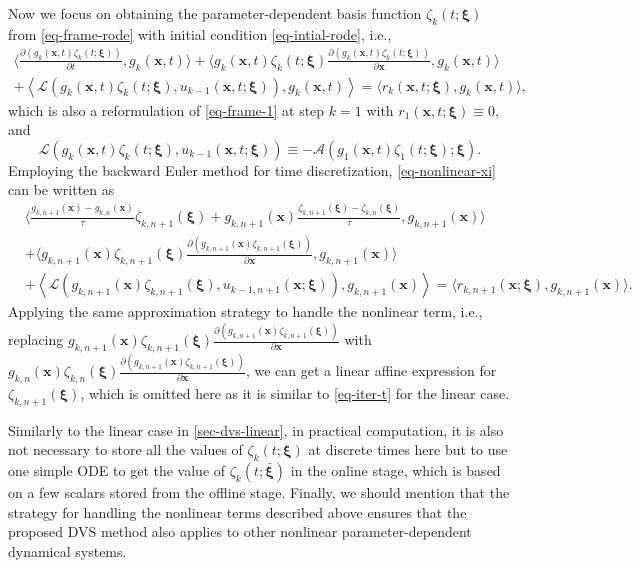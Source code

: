\documentclass[10pt,a4paper]{article}
\numberwithin{equation}{section}
\numberwithin{lemma}{section}
\numberwithin{example}{section}
\numberwithin{definition}{section}
\numberwithin{assumption}{section}
\numberwithin{theorem}{section}
\numberwithin{proposition}{section}
\numberwithin{corollary}{section}
\numberwithin{remark}{section}
\def\[{\begin{equation}}
\begin{document}
Now we focus on obtaining the parameter-dependent basis function $\zeta_k(t;\bm{\xi})$ from \eqref{eq-frame-rode} with initial condition \eqref{eq-intial-rode}, i.e.,
\begin{equation}
\label{eq-nonlinear-xi}
\begin{aligned}
\Big\langle \frac{\partial (g_k(\bm{x},t)\zeta_k(t;\bm{\xi}))}{\partial t},g_k(\bm{x},t)\Big\rangle
+\Big\langle g_k(\bm{x},t)\zeta_k(t;\bm{\xi})\frac{\partial (g_k(\bm{x},t)\zeta_k(t;\bm{\xi}))}{\partial \bm{x}},g_k(\bm{x},t)\Big\rangle\\
+\left\langle\mathcal{L}(g_k(\bm{x},t)\zeta_k(t;\bm{\xi}),u_{k-1}(\bm{x},t;\bm{\xi})),g_k(\bm{x},t)\right\rangle
=\langle r_k(\bm{x},t;\bm{\xi}),g_k(\bm{x},t)\rangle,
\end{aligned}
\end{equation}
which is also a reformulation of \eqref{eq-frame-1} at step $k=1$ with $r_1(\bm{x},t;\bm{\xi})\equiv 0,$
and 
$$
\mathcal{L}(g_k(\bm{x},t)\zeta_k(t;\bm{\xi}),u_{k-1}(\bm{x},t;\bm{\xi}))\equiv-\mathcal{A}(g_1(\bm{x},t)\zeta_1(t;\bm{\xi});\bm{\xi}).
$$
Employing the backward Euler method for time discretization, \eqref{eq-nonlinear-xi} can be written as
$$
\begin{aligned}
    &\Big\langle \frac{g_{k,n+1}(\bm{x})-g_{k,n}(\bm{x})}{\tau}\zeta_{k,n+1}(\bm{\xi})+g_{k,n+1}(\bm{x})\frac{\zeta_{k,n+1}(\bm{\xi})-\zeta_{k,n}(\bm{\xi})}{\tau},g_{k,n+1}(\bm{x}) \Big\rangle
    \\[1mm]
    &+\Big\langle g_{k,n+1}(\bm{x})\zeta_{k,n+1}(\bm{\xi})\frac{\partial (g_{k,n+1}(\bm{x})\zeta_{k,n+1}(\bm{\xi}))}{\partial \bm{x}},g_{k,n+1}(\bm{x})\Big\rangle
    \\[1mm]
    &+\left\langle \mathcal{L}(g_{k,n+1}(\bm{x})\zeta_{k,n+1}(\bm{\xi}),u_{k-1,n+1}(\bm{x};\bm{\xi})),g_{k,n+1}(\bm{x})\right\rangle 
    =\langle r_{k,n+1}(\bm{x};\bm{\xi}),g_{k,n+1}(\bm{x})\rangle.
    \end{aligned}
$$
Applying the same approximation strategy to handle the nonlinear term, i.e., replacing
$
g_{k,n+1}(\bm{x})\zeta_{k,n+1}(\bm{\xi})\frac{\partial (g_{k,n+1}(\bm{x})\zeta_{k,n+1}(\bm{\xi}))}{\partial \bm{x}}$ with
$ g_{k,n}(\bm{x})\zeta_{k,n}(\bm{\xi})\frac{\partial (g_{k,n+1}(\bm{x})\zeta_{k,n+1}(\bm{\xi}))}{\partial \bm{x}}
$,
we can get a linear affine expression for $\zeta_{k,n+1}(\bm{\xi})$, which is omitted here as it is similar to \eqref{eq-iter-t} for the linear case. 


Similarly to the linear case in \cref{sec-dvs-linear}, in practical computation, 
it is also not necessary to store all the values of $\zeta_{k}(t;\bm{\xi})$ at discrete times here but to use one simple ODE to get the value of $\zeta_{k}(t;\bm{\bar \xi})$ in the online stage,  which is based on a few scalars stored from the offline stage. 
Finally, we should mention that the strategy for handling the nonlinear terms described above ensures that the proposed DVS method also applies to other nonlinear parameter-dependent dynamical systems.
\end{document}
